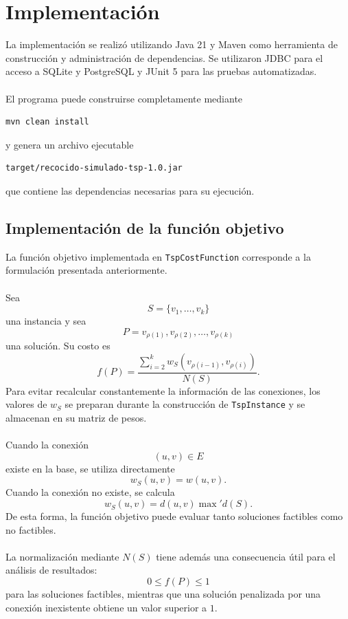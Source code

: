 \documentclass[12pt]{article}
\begin{document}
\section{Implementación}
\label{sec:implementacion}

La implementación se realizó utilizando Java 21 y Maven como herramienta de
construcción y administración de dependencias. Se utilizaron JDBC para el
acceso a SQLite y PostgreSQL y JUnit 5 para las pruebas automatizadas.
\\\\
El programa puede construirse completamente mediante
\begin{verbatim}
mvn clean install
\end{verbatim}
y genera un archivo ejecutable
\begin{verbatim}
target/recocido-simulado-tsp-1.0.jar
\end{verbatim}
que contiene las dependencias necesarias para su ejecución.

\subsection{Implementación de la función objetivo}
\label{subsec:implementacion-costo}

La función objetivo implementada en \texttt{TspCostFunction} corresponde a
la formulación presentada anteriormente.
\\\\
Sea
\[
    S=\{v_1,\ldots,v_k\}
\]
una instancia y sea
\[
    P=
    v_{\rho(1)},
    v_{\rho(2)},
    \ldots,
    v_{\rho(k)}
\]
una solución. Su costo es
\[
    f(P)=
    \frac{
        \displaystyle
        \sum_{i=2}^{k}
        w_S
        \left(
            v_{\rho(i-1)},
            v_{\rho(i)}
        \right)
    }{
        N(S)
    }.
\]
Para evitar recalcular constantemente la información de las conexiones, los
valores de \(w_S\) se preparan durante la construcción de
\texttt{TspInstance} y se almacenan en su matriz de pesos.
\\\\
Cuando la conexión
\[
    (u,v)\in E
\]
existe en la base, se utiliza directamente
\[
    w_S(u,v)=w(u,v).
\]
Cuando la conexión no existe, se calcula
\[
    w_S(u,v)=
    d(u,v)\max{}'d(S).
\]
De esta forma, la función objetivo puede evaluar tanto soluciones factibles
como no factibles.
\\\\
La normalización mediante \(N(S)\) tiene además una consecuencia útil para
el análisis de resultados:
\[
    0\leq f(P)\leq1
\]
para las soluciones factibles, mientras que una solución penalizada por una
conexión inexistente obtiene un valor superior a \(1\).
\end{document}
